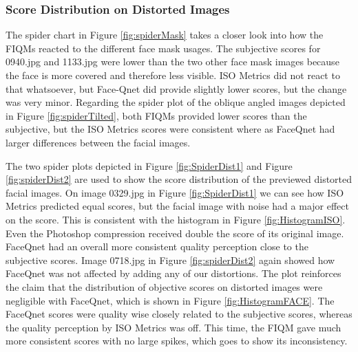 \subsubsection{Score Distribution on Distorted Images} 

The spider chart in Figure \ref{fig:spiderMask} takes a closer look into how the FIQMs reacted to the different face mask usages. The subjective scores for 0940.jpg and 1133.jpg were lower than the two other face mask images because the face is more covered and therefore less visible. ISO Metrics did not react to that whatsoever, but Face-Qnet did provide slightly lower scores, but the change was very minor. Regarding the spider plot of the oblique angled images depicted in Figure \ref{fig:spiderTilted}, both FIQMs provided lower scores than the subjective, but the ISO Metrics scores were consistent where as FaceQnet had larger differences between the facial images.

The two spider plots depicted in Figure \ref{fig:SpiderDist1} and Figure \ref{fig:spiderDist2} are used to show the score distribution of the previewed distorted facial images. On image 0329.jpg in Figure \ref{fig:SpiderDist1} we can see how ISO Metrics predicted equal scores, but the facial image with noise had a major effect on the score. This is consistent with the histogram in Figure \ref{fig:HistogramISO}. Even the Photoshop compression received double the score of its original image. FaceQnet had an overall more consistent quality perception close to the subjective scores. Image 0718.jpg in Figure \ref{fig:spiderDist2} again showed how FaceQnet was not affected by adding any of our distortions. The plot reinforces the claim that the distribution of objective scores on distorted images were negligible with FaceQnet, which is shown in Figure \ref{fig:HistogramFACE}. The FaceQnet scores were quality wise closely related to the subjective scores, whereas the quality perception by ISO Metrics was off. This time, the FIQM gave much more consistent scores with no large spikes, which goes to show its inconsistency.


